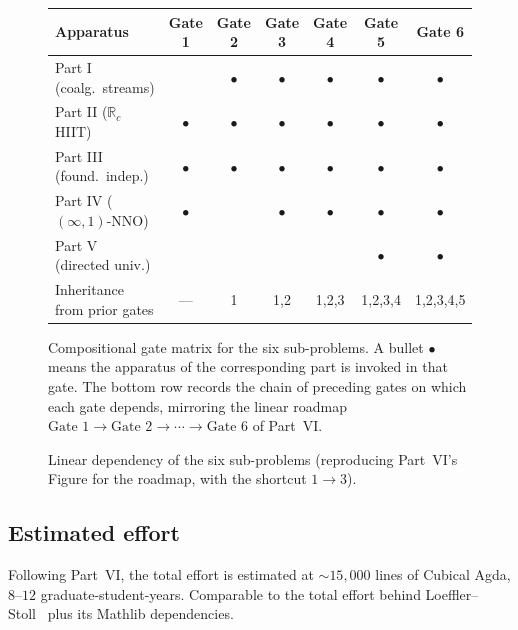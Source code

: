 \documentclass[12pt]{article}
\theoremstyle{definition}
\theoremstyle{remark}
\newcommand{\R}{\mathbb{R}}
\newcommand{\Rc}{\R_{c}}
\begin{document}
\begin{figure}[htbp]
\centering
\begin{tabular}{l c c c c c c}
\toprule
Apparatus & Gate 1 & Gate 2 & Gate 3 & Gate 4 & Gate 5 & Gate 6 \\
\midrule
Part I (coalg.\ streams)            &         & $\bullet$ & $\bullet$ & $\bullet$ & $\bullet$ & $\bullet$ \\
Part II ($\Rc$ HIIT)                & $\bullet$ & $\bullet$ & $\bullet$ & $\bullet$ & $\bullet$ & $\bullet$ \\
Part III (found.\ indep.)           & $\bullet$ & $\bullet$ & $\bullet$ & $\bullet$ & $\bullet$ & $\bullet$ \\
Part IV ($(\infty,1)$-NNO)          & $\bullet$ &           & $\bullet$ & $\bullet$ & $\bullet$ & $\bullet$ \\
Part V (directed univ.)             &           &           &           &           & $\bullet$ & $\bullet$ \\
\midrule
Inheritance from prior gates        & ---       & 1         & 1,2       & 1,2,3     & 1,2,3,4   & 1,2,3,4,5 \\
\bottomrule
\end{tabular}
\caption{Compositional gate matrix for the six sub-problems. A bullet
$\bullet$ means the apparatus of the corresponding part is invoked
in that gate. The bottom row records the chain of preceding gates on
which each gate depends, mirroring the linear roadmap
$\text{Gate 1} \to \text{Gate 2} \to \cdots \to \text{Gate 6}$
of Part~VI.}
\label{fig:gates}
\end{figure}

\begin{figure}[hbtp]
\centering
{}
\caption{Linear dependency of the six sub-problems
(reproducing Part~VI's Figure for the roadmap, with the shortcut
$1 \to 3$).}\label{fig:gateschain}
\end{figure}

\subsection{Estimated effort}

Following Part~VI, the total effort is estimated at $\sim 15{,}000$ lines
of Cubical Agda, $8$--$12$ graduate-student-years. Comparable to the
total effort behind Loeffler--Stoll~\cite{loefflerstoll} plus its
Mathlib dependencies.
\end{document}
